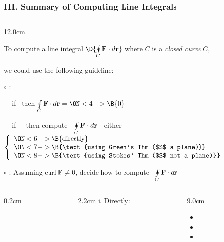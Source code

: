 \begin{frame}
\frametitle{III. Summary of Computing Line Integrals}
\scriptsize
\begin{columns}
\begin{column}{12.0cm}

To compute a line integral \quad $\D{\oint \limits_{C} {\bf F} \cdot d{\bf r}}$ \quad where $C$ is a {\em closed curve} $C$, 

\vspace{0.4cm}

we could use the following guideline:

\vspace{0.4cm}

$\circ$ : \quad 
{}

\vspace{0.2cm}

\hspace{0.8cm} - \, if \, 
 \quad then \quad $\oint \limits_{C} {\bf F} \cdot d{\bf r} = 
\ON<4->{\B{0}}$

\vspace{0.2cm}

\hspace{0.8cm} - \, if \, 
 \,\, then compute \,\, $\oint \limits_{C} {\bf F} \cdot d{\bf r}$ \,\, either \,
$\left\{
\begin{array}{l}
	\ON<6->{\B{\text{directly}}}\\
	\ON<7->{\B{\text{using Green's Thm ($S$ a plane)}}}\\
	\ON<8->{\B{\text{using Stokes' Thm ($S$ not a plane)}}}
\end{array}
\right.$

\vspace{0.6cm}

$\circ$ : Assuming curl\,{${\bf F} \ne 0$}, decide how to compute \, $\oint \limits_{C} {\bf F} \cdot d{\bf r}$

\begin{columns}
\begin{column}{0.2cm}
\end{column}
\begin{column}{2.2cm}
	i. Directly:
	
	\vspace{1.2cm}
\end{column}
\begin{column}{9.0cm}
\begin{itemize}
	\item {}
	\vspace{0.2cm}
	\item {}
	\vspace{0.2cm}
	\item {}
\end{itemize}
\end{column}
\end{columns}


\end{column}
\end{columns}
\end{frame}
